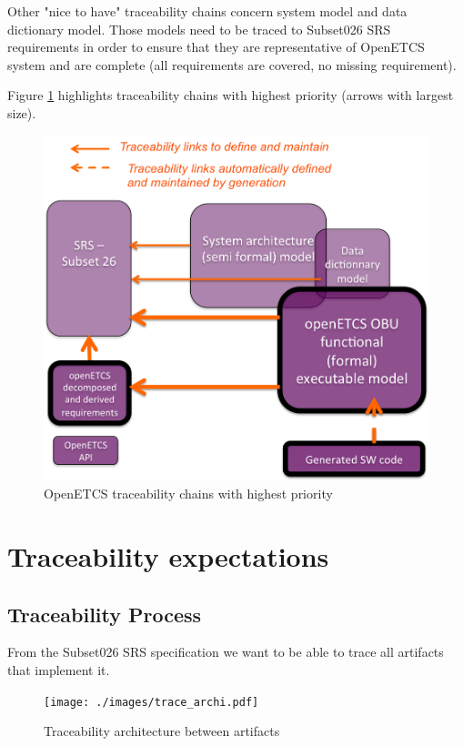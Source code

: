 \documentclass[11pt]{template/openetcs_report}
\begin{document}
Other "nice to have" traceability chains concern system model and data dictionary model. Those models need to be traced to Subset026 SRS requirements in order to ensure that they are representative of OpenETCS system and are complete (all requirements are covered, no missing requirement). 

Figure \ref{fig:openETCSTraceabilityMainPriority} highlights traceability chains with highest priority (arrows with largest size).

\begin{figure}[htb]
\centering
\includegraphics[width=.9\linewidth]
{./images/openETCSTraceabilityMainPriority.png}
\caption{\label{fig:openETCSTraceabilityMainPriority}OpenETCS traceability chains with highest priority}
\end{figure}

\section{Traceability expectations}

\subsection{Traceability Process}
\label{sec-2-2-1}
From the Subset026 SRS specification we want to be able to trace all artifacts
that implement it.
\begin{figure}[htb]
\centering
\texttt{[image: ./images/trace\_archi.pdf]}
\caption{\label{fig:trace_process}Traceability architecture between artifacts}
\end{figure}
\end{document}
